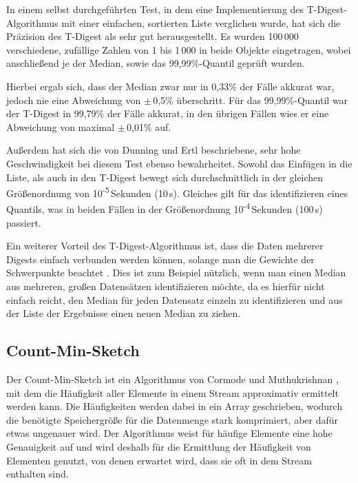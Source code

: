 In einem selbst durchgeführten Test, in dem eine Implementierung des T-Digest-Algorithmus mit einer einfachen, sortierten Liste verglichen wurde, hat sich die Präzision des T-Digest als sehr gut herausgestellt.
Es wurden 100\,000 verschiedene, zufällige Zahlen von 1 bis 1\,000 in beide Objekte eingetragen, wobei anschließend je der Median, sowie das 99,99\%-Quantil geprüft wurden.

Hierbei ergab sich, dass der Median zwar nur in 0,33\% der Fälle akkurat war, jedoch nie eine Abweichung von $\pm$\,0,5\% überschritt.
Für das 99,99\%-Quantil war der T-Digest in 99,79\% der Fälle akkurat, in den übrigen Fällen wies er eine Abweichung von maximal $\pm$\,0,01\% auf.

Außerdem hat sich die von Dunning und Ertl \cite{dunning2019} beschriebene, sehr hohe Geschwindigkeit bei diesem Test ebenso bewahrheitet.
Sowohl das Einfügen in die Liste, als auch in den T-Digest bewegt sich durchschnittlich in der gleichen Größenordnung von 10\textsuperscript{-5}\,Sekunden (10\,\textmu{}s).
Gleiches gilt für das identifizieren eines Quantils, was in beiden Fällen in der Größenordnung 10\textsuperscript{-4}\,Sekunden (100\,\textmu{}s) passiert.

Ein weiterer Vorteil des T-Digest-Algorithmus ist, dass die Daten mehrerer Digests einfach verbunden werden können, solange man die Gewichte der Schwerpunkte beachtet \cite{dunning2019}.
Dies ist zum Beispiel nützlich, wenn man einen Median aus mehreren, großen Datensätzen identifizieren möchte, da es hierfür nicht einfach reicht, den Median für jeden Datensatz einzeln zu identifizieren und aus der Liste der Ergebnisse einen neuen Median zu ziehen.


\subsection{Count-Min-Sketch}

Der Count-Min-Sketch ist ein Algorithmus von Cormode und Muthukrishnan \cite{cormode2005}, 
mit dem die Häufigkeit aller Elemente in einem Stream approximativ ermittelt werden kann. 
Die Häufigkeiten werden dabei in ein Array geschrieben, 
wodurch die benötigte Speichergröße für die Datenmenge stark komprimiert, 
aber dafür etwas ungenauer wird. 
Der Algorithmus weist für häufige Elemente eine hohe Genauigkeit auf 
und wird deshalb für die Ermittlung der Häufigkeit von Elementen genutzt, 
von denen erwartet wird, dass sie oft in dem Stream enthalten sind.


